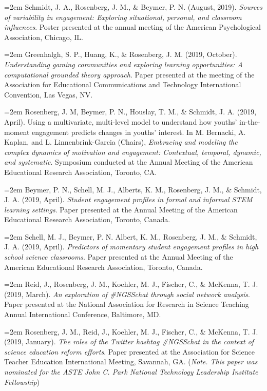 \documentclass[
  14,
]{article}
\begin{document}
\hangindent=2em Schmidt, J. A., Rosenberg, J. M., \& Beymer, P. N.
(August, 2019). \emph{Sources of variability in engagement: Exploring
situational, personal, and classroom influences}. Poster presented at
the annual meeting of the American Psychological Association, Chicago,
IL.

\hangindent=2em Greenhalgh, S. P., Huang, K., \& Rosenberg, J. M. (2019,
October). \emph{Understanding gaming communities and exploring learning
opportunities: A computational grounded theory approach}. Paper
presented at the meeting of the Association for Educational
Communications and Technology International Convention, Las Vegas, NV.

\hangindent=2em Rosenberg, J. M, Beymer, P. N., Houslay, T. M., \&
Schmidt, J. A. (2019, April). Using a multivariate, multi-level model to
understand how youths' in-the-moment engagement predicts changes in
youths' interest. In M. Bernacki, A. Kaplan, and L. Linnenbrink-Garcia
(Chairs), \emph{Embracing and modeling the complex dynamics of
motivation and engagement: Contextual, temporal, dynamic, and
systematic}. Symposium conducted at the Annual Meeting of the American
Educational Research Association, Toronto, CA.

\hangindent=2em Beymer, P. N., Schell, M. J., Alberts, K. M., Rosenberg,
J. M., \& Schmidt, J. A. (2019, April). \emph{Student engagement
profiles in formal and informal STEM learning settings}. Paper presented
at the Annual Meeting of the American Educational Research Association,
Toronto, Canada.

\hangindent=2em Schell, M. J., Beymer, P. N. Albert, K. M., Rosenberg,
J. M., \& Schmidt, J. A. (2019, April). \emph{Predictors of momentary
student engagement profiles in high school science classrooms}. Paper
presented at the Annual Meeting of the American Educational Research
Association, Toronto, Canada.

\hangindent=2em Reid, J., Rosenberg, J. M., Koehler, M. J., Fischer, C.,
\& McKenna, T. J. (2019, March). \emph{An exploration of \#NGSSchat
through social network analysis}. Paper presented at the National
Association for Research in Science Teaching Annual International
Conference, Baltimore, MD.

\hangindent=2em Rosenberg, J. M., Reid, J., Koehler, M. J., Fischer, C.,
\& McKenna, T. J. (2019, January). \emph{The roles of the Twitter
hashtag \#NGSSchat in the context of science education reform efforts}.
Paper presented at the Association for Science Teacher Education
International Meeting, Savannah, GA. (\emph{Note. This paper was
nominated for the ASTE John C. Park National Technology Leadership
Institute Fellowship})
\end{document}
